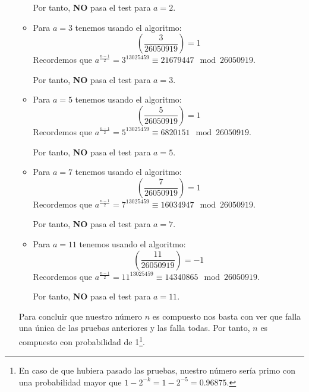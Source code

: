 \begin{enumerate}
\begin{itemize}
			Por tanto, \textbf{NO} pasa el test para $a = 2$.
			
			\item Para $a = 3$ tenemos usando el algoritmo:
			$$\left(\frac{3}{26050919} \right) = 1$$
			Recordemos que $ a^{\frac{n-1}{2}} = 3^{13025459} \equiv 21679447 \mod 26050919$.
			
			Por tanto, \textbf{NO} pasa el test para $a = 3$.
			
			\item Para $a = 5$ tenemos usando el algoritmo:
			$$\left(\frac{5}{26050919} \right) = 1$$
			Recordemos que $ a^{\frac{n-1}{2}} = 5^{13025459} \equiv 6820151 \mod 26050919$.
			
			Por tanto, \textbf{NO} pasa el test para $a = 5$.
			
			\item Para $a = 7$ tenemos usando el algoritmo:
			$$\left(\frac{7}{26050919} \right) = 1$$
			Recordemos que $ a^{\frac{n-1}{2}} = 7^{13025459} \equiv 16034947 \mod 26050919$.
			
			Por tanto, \textbf{NO} pasa el test para $a = 7$.
			
			\item Para $a = 11$ tenemos usando el algoritmo:
			$$\left(\frac{11}{26050919} \right) = -1$$
			Recordemos que $ a^{\frac{n-1}{2}} = 11^{13025459} \equiv 14340865 \mod 26050919$.
			
			Por tanto, \textbf{NO} pasa el test para $a = 11$.		
		\end{itemize}
		
		Para concluir que nuestro número $n$ es compuesto nos basta con ver que falla una única de las pruebas
		anteriores y las falla todas. Por tanto, $n$ es compuesto con probabilidad de 1\footnote{En caso de que
		hubiera pasado las pruebas, nuestro número sería primo con una probabilidad mayor que $1-2^{-k} =
		1-2^{-5} = 0.96875$.}.
		
	\end{enumerate}
